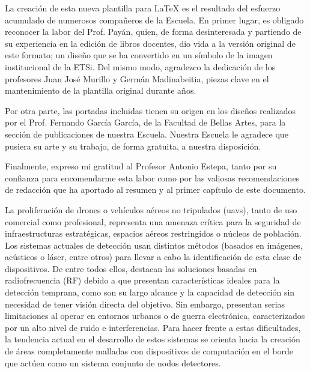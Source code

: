 
La creación de esta nueva plantilla para \LaTeX{} es el resultado del esfuerzo acumulado de numerosos compañeros de la Escuela. En primer lugar, es obligado reconocer la labor del Prof. Payán, quien, de forma desinteresada y partiendo de su experiencia en la edición de libros docentes, dio vida a la versión original de este formato; un diseño que se ha convertido en un símbolo de la imagen institucional de la ETSi. Del mismo modo, agradezco la dedicación de los profesores Juan José Murillo y Germán Madinabeitia, piezas clave en el mantenimiento de la plantilla original durante años.

Por otra parte, las portadas incluidas tienen su origen en los diseños realizados por el Prof. Fernando García García, de la Facultad de Bellas Artes, para la sección de publicaciones de nuestra Escuela. Nuestra Escuela le agradece que pusiera su arte y su trabajo, de forma gratuita, a nuestra disposición.

Finalmente, expreso mi gratitud al Profesor Antonio Estepa, tanto por su confianza para encomendarme esta labor como por las valiosas recomendaciones de redacción que ha aportado al resumen y al primer capítulo de este documento.

{}%
{}%

La proliferación de drones o vehículos aéreos no tripulados (\glspl{uav}), tanto de uso comercial como profesional, representa una amenaza crítica para la seguridad de infraestructuras estratégicas, espacios aéreos restringidos o núcleos de población. Los sistemas actuales de detección usan distintos métodos (basados en imágenes, acústicos o láser, entre otros) para llevar a cabo la identificación de esta clase de dispositivos. De entre todos ellos, destacan las soluciones basadas en radiofrecuencia (RF) debido a que presentan características ideales para la detección temprana, como son su largo alcance y la capacidad de detección sin necesidad de tener visión directa del objetivo. Sin embargo, presentan serias limitaciones al operar en entornos urbanos o de guerra electrónica, caracterizados por un alto nivel de ruido e interferencias. Para hacer frente a estas dificultades, la tendencia actual en el desarrollo de estos sistemas se orienta hacia la creación de áreas completamente malladas con dispositivos de computación en el borde que actúen como un sistema conjunto de nodos detectores.

